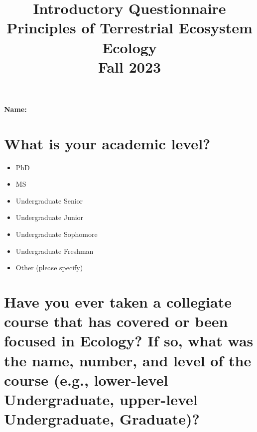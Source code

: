 \documentclass[12pt, notitlepage]{article}   	%
\title{
	\textbf{
		Introductory Questionnaire
	} \\
	\large{Principles of Terrestrial Ecosystem Ecology} \\
	\large{Fall 2023}
}
\date{\vspace{-5ex}}
\def\wl{\par \vspace{\baselineskip}}
\begin{document}
{\selectfont %

\maketitle

\Large{\textbf{Name:} \underline{\hspace{10cm}}}

\section{What is your academic level?}
\begin{itemize}
	\item{\underline{\hspace{1cm}} PhD}
	\item{\underline{\hspace{1cm}} MS}
	\item{\underline{\hspace{1cm}} Undergraduate Senior}
	\item{\underline{\hspace{1cm}} Undergraduate Junior}
	\item{\underline{\hspace{1cm}} Undergraduate Sophomore}
	\item{\underline{\hspace{1cm}} Undergraduate Freshman}
	\item{\underline{\hspace{1cm}} Other (please specify)}
\end{itemize}

\section{Have you ever taken a collegiate course that has covered or been focused in 
Ecology? If so, what was the name, number, and level of the course (e.g., lower-level Undergraduate,
upper-level Undergraduate, Graduate)?}

\wl
\wl
\wl
\wl
\wl
\wl
\wl
\wl

\newpage

}
\end{document}
